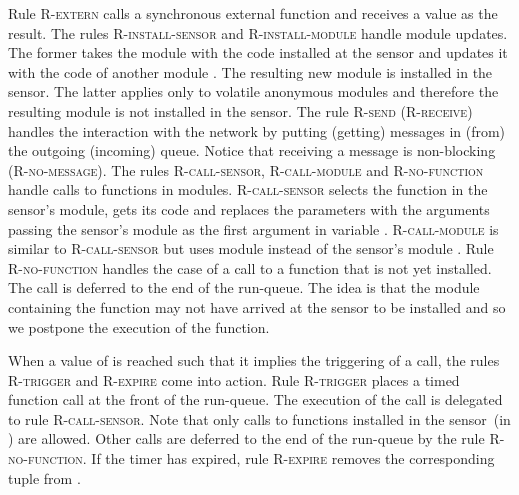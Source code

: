 \documentclass[copyright,creativecommons]{eptcs}
\newcommand{\selfk}{\text{self}}
\newcommand{\mkRrule}[1]{{\footnotesize \textsc{R-#1}}}
\newcommand{\RinstallS}{\mkRrule{install-sensor}}
\newcommand{\RinstallM}{\mkRrule{install-module}}
\newcommand{\RcallS}{\mkRrule{call-sensor}}
\newcommand{\RcallM}{\mkRrule{call-module}}
\newcommand{\Rnocall}{\mkRrule{no-function}}
\newcommand{\Rtrigger}{\mkRrule{trigger}}
\newcommand{\Rdiscard}{\mkRrule{expire}}
\newcommand{\Rsend}{\mkRrule{send}}
\newcommand{\Rreceive}{\mkRrule{receive}}
\newcommand{\Rsystem}{\mkRrule{extern}}
\newcommand{\RreceiveN}{\mkRrule{no-message}}
\begin{document}
Rule \Rsystem{} calls a synchronous external function and receives a
value as the result. The rules \RinstallS{} and \RinstallM{} handle
module updates. The former takes the module with the code installed at
the sensor and updates it with the code of another module . The
resulting new module is installed in the sensor. The latter applies
only to volatile anonymous modules and therefore the resulting module
is not installed in the sensor. The rule \Rsend{} (\Rreceive{})
handles the interaction with the network by putting (getting) messages
in (from) the outgoing (incoming) queue. Notice that receiving a 
message is non-blocking (\RreceiveN).
The rules \RcallS{}, \RcallM{} and \Rnocall{} handle calls to
functions in modules. \RcallS{} selects the function in the
sensor's module, gets its code and replaces the parameters with the
arguments passing the sensor's module  as the first argument
in variable \selfk. \RcallM{} is similar to \RcallS{} but uses 
module  instead of the sensor's module .
Rule \Rnocall{} handles the case of a call to a
function that is not yet installed. The call is deferred to the end of
the run-queue. The idea is that the module containing the function
may not have arrived at the sensor to be installed and so we postpone
the execution of the function.

When a value of  is reached such that it implies the triggering of
a call, the rules \Rtrigger{} and \Rdiscard{} come into action. Rule
\Rtrigger{} places a timed function call  at the front of
the run-queue. The execution of the call is delegated to rule
\RcallS{}. Note that only calls to functions installed in the
sensor~(in ) are allowed. Other calls are deferred to the end of the
run-queue by the rule \Rnocall{}. If the timer has expired, rule
\Rdiscard{} removes the corresponding tuple from .
\end{document}
